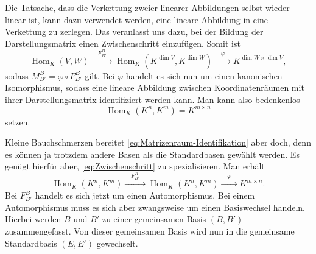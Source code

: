 \documentclass[a4paper,11pt,fleqn,twoside]{scrartcl}
\numberwithin{equation}{section}
\begin{document}
Die Tatsache, dass die Verkettung zweier linearer Abbildungen
selbst wieder linear ist, kann dazu verwendet werden, eine
lineare Abbildung in eine Verkettung zu zerlegen. Das veranlasst
uns dazu, bei der Bildung der Darstellungsmatrix einen
Zwischenschritt einzufügen. Somit ist
\begin{equation}\label{eq:Zwischenschritt}
\operatorname{Hom}_K(V,W)
\xrightarrow{\displaystyle\quad F_{B'}^B\quad}\operatorname{Hom}_K (K^{\dim V},K^{\dim W})
\xrightarrow{\displaystyle\quad\varphi\quad}K^{\dim W\times\dim V},
\end{equation}
sodass $M_{B'}^B = \varphi\circ F_{B'}^B$ gilt. Bei $\varphi$
handelt es sich nun um einen kanonischen Isomorphismus, sodass
eine lineare Abbildung zwischen Koordinatenräumen mit ihrer
Darstellungsmatrix identifiziert werden kann. Man kann also
bedenkenlos
\begin{equation}\label{eq:Matrizenraum-Identifikation}
\operatorname{Hom}_K (K^n,K^m) = K^{m\times n}
\end{equation}
setzen.

Kleine Bauchschmerzen bereitet \eqref{eq:Matrizenraum-Identifikation}
aber doch, denn es können ja trotzdem andere Basen als die
Standardbasen gewählt werden. Es genügt hierfür aber,
\eqref{eq:Zwischenschritt} zu spezialisieren. Man erhält
\begin{equation}
\operatorname{Hom}_K(K^n,K^m)
\xrightarrow{\displaystyle\quad F_{B'}^B\quad}\operatorname{Hom}_K (K^n,K^m)
\xrightarrow{\displaystyle\quad\varphi\quad}K^{m\times n}.
\end{equation}
Bei $F_{B'}^B$ handelt es sich jetzt um einen Automorphismus.
Bei einem Automorphismus muss es sich aber zwangsweise um einen
Basiswechsel handeln. Hierbei werden $B$ und $B'$ zu einer
gemeinsamen Basis $(B,B')$ zusammengefasst. Von dieser gemeinsamen
Basis wird nun in die gemeinsame Standardbasis $(E,E')$
gewechselt.
\end{document}
